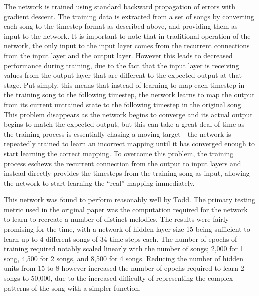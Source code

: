 \documentclass[ author={Stephen Livermore-Tozer},
				supervisor={Dr. Peter Flach},
				degree={MEng},
				title={Performing Algorithmic Co-composition Using Machine Learning},
				subtitle={},
				type={research},
				year={2016} ]{dissertation}
\begin{document}
	The network is trained using standard backward propagation of errors with gradient descent. The training data is extracted from a set of songs by converting each song to the timestep format as described above, and providing them as input to the network. It is important to note that in traditional operation of the network, the only input to the input layer comes from the recurrent connections from the input layer and the output layer. However this leads to decreased performance during training, due to the fact that the input layer is receiving values from the output layer that are different to the expected output at that stage. Put simply, this means that instead of learning to map each timestep in the training song to the following timestep, the network learns to map the output from its current untrained state to the following timestep in the original song. This problem disappears as the network begins to converge and its actual output begins to match the expected output, but this can take a great deal of time as the training process is essentially chasing a moving target - the network is repeatedly trained to learn an incorrect mapping until it has converged enough to start learning the correct mapping. To overcome this problem, the training process eschews the recurrent connection from the output to input layers and instead directly provides the timesteps from the training song as input, allowing the network to start learning the ``real'' mapping immediately.
	
	This network was found to perform reasonably well by Todd. The primary testing metric used in the original paper was the computation required for the network to learn to recreate a number of distinct melodies. The results were fairly promising for the time, with a network of hidden layer size 15 being sufficient to learn up to 4 different songs of 34 time steps each. The number of epochs of training required notably scaled linearly with the number of songs; 2,000 for 1 song, 4,500 for 2 songs, and 8,500 for 4 songs. Reducing the number of hidden units from 15 to 8 however increased the number of epochs required to learn 2 songs to 50,000, due to the increased difficulty of representing the complex patterns of the song with a simpler function.
	
\end{document}
